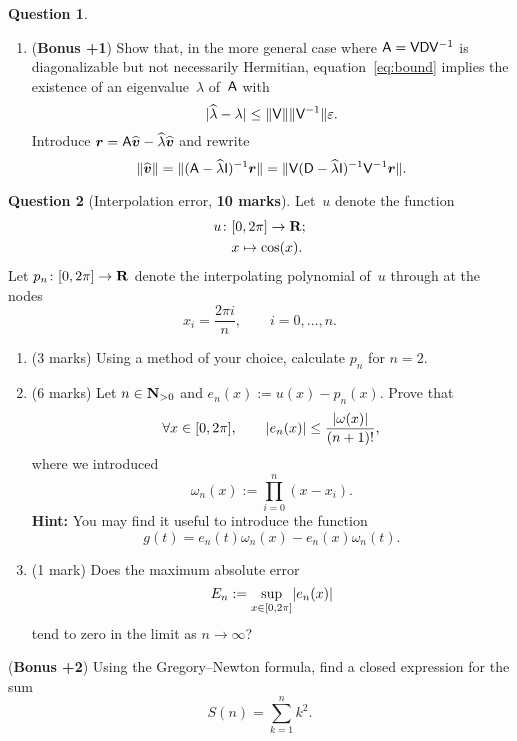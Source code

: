 \documentclass[11pt]{article}
\theoremstyle{definition}
\newtheorem{question}{Question}
\begin{document}
\begin{question}
\begin{enumerate}
        \item
            (\textbf{Bonus +1}) Show that, in the more general case where $\mathsf A = \mathsf V \mathsf D \mathsf V^{-1}$ is diagonalizable but not necessarily Hermitian,
            equation~\eqref{eq:bound} implies the existence of an eigenvalue~$\lambda$ of~$\mathsf A$ with
            \[
                \lvert\widehat \lambda - \lambda\rvert \leq \lVert\mathsf V\rVert \lVert\mathsf V^{-1}\rVert \varepsilon.
            \]
            Introduce $\mathbf{\boldsymbol{r}} = \mathsf A \widehat{\mathbf{\boldsymbol{v}}} - \widehat{\lambda} \widehat{\mathbf{\boldsymbol{v}}}$ and rewrite
            \[
                \lVert\widehat {\mathbf{\boldsymbol{v}}}\rVert = \lVert(\mathsf A - \widehat \lambda \mathsf I)^{-1}  {\mathbf{\boldsymbol{r}}}\rVert
                = \lVert\mathsf V (\mathsf D - \widehat \lambda \mathsf I)^{-1}  \mathsf V^{-1} {\mathbf{\boldsymbol{r}}}\rVert.
            \]
    \end{enumerate}
\end{question}

\newpage
\begin{question}
    [Interpolation error, \textbf{10 marks}]
    Let~$u$ denote the function
    \begin{align*}
        u\colon
        &[0, 2\pi] \to \mathbf R; \\
        &x \mapsto \cos(x).
    \end{align*}
    Let $p_n \colon [0, 2 \pi] \to \mathbf R$ denote the interpolating polynomial of~$u$ through at the nodes
    \[
        x_i = \frac{2 \pi i}{n}, \qquad i = 0, \dotsc, n.
    \]
    \begin{enumerate}
        \item
            (3 marks)
            Using a method of your choice,
            calculate $p_n$ for $n = 2$.

        \item
            (6 marks)
            Let $n \in \mathbf N_{>0}$ and $e_n(x) := u(x) - p_n(x)$.
            Prove that
            \[
                \forall x \in [0, 2\pi], \qquad
                \lvert e_n(x)\rvert
                \leq \frac{\lvert \omega(x) \rvert}{(n+1)!},
            \]
            where we introduced
            \[
                \omega_n(x) := \prod_{i=0}^{n} (x - x_i).
            \]
            \textbf{Hint:} You may find it useful to introduce the function
            \[
                g(t) = e_n(t) \omega_n(x) - e_n(x) \omega_n(t).
            \]

        \item
            (1 mark) Does the maximum absolute error
            \[
                E_n := \sup_{x \in [0, 2\pi]} \lvert e_n(x)\rvert
            \]
            tend to zero in the limit as $n \to \infty$?
    \end{enumerate}

    \noindent (\textbf{Bonus +2}) Using the Gregory--Newton formula,
    find a closed expression for the sum
    \[
        S(n) = \sum_{k=1}^{n} k^2.
    \]
\end{question}
\end{document}
